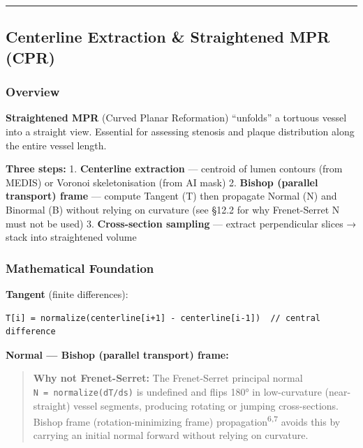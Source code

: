 \documentclass[
  11pt,
]{article}
\begin{document}
\begin{center}\rule{0.5\linewidth}{0.5pt}\end{center}

\subsection{Centerline Extraction \& Straightened MPR
(CPR)}\label{centerline-extraction-straightened-mpr-cpr}

\subsubsection{Overview}\label{overview}

\textbf{Straightened MPR} (Curved Planar Reformation) ``unfolds'' a
tortuous vessel into a straight view. Essential for assessing stenosis
and plaque distribution along the entire vessel length.

\textbf{Three steps:} 1. \textbf{Centerline extraction} --- centroid of
lumen contours (from MEDIS) or Voronoi skeletonisation (from AI mask) 2.
\textbf{Bishop (parallel transport) frame} --- compute Tangent (T) then
propagate Normal (N) and Binormal (B) without relying on curvature (see
§12.2 for why Frenet-Serret N must not be used) 3. \textbf{Cross-section
sampling} --- extract perpendicular slices → stack into straightened
volume

\subsubsection{Mathematical Foundation}\label{mathematical-foundation}

\textbf{Tangent} (finite differences):

\begin{verbatim}
T[i] = normalize(centerline[i+1] - centerline[i-1])  // central difference
\end{verbatim}

\textbf{Normal --- Bishop (parallel transport) frame:}

\begin{quote}
\textbf{Why not Frenet-Serret:} The Frenet-Serret principal normal
\texttt{N\ =\ normalize(dT/ds)} is undefined and flips 180° in
low-curvature (near-straight) vessel segments, producing rotating or
jumping cross-sections. Bishop frame (rotation-minimizing frame)
propagation\textsuperscript{6,7} avoids this by carrying an initial
normal forward without relying on curvature.
\end{quote}
\end{document}
